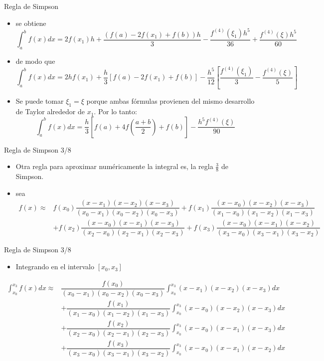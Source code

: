 \documentclass[12pt]{beamer}
\begin{document}
\begin{frame}{Regla de Simpson}
  \begin{itemize}
    \item se obtiene
    \footnotesize{
    $$
    \int_a^bf(x)dx = 2f(x_1)h + \frac{(f(a)-2f(x_1)+f(b))h}{3} - \frac{f^{(4)}(\xi_1)h^5}{36} + \frac{f^{(4)}(\xi)h^5}{60}
    $$}
    \item<2->de modo que
      $$
      \int_{a}^{b}f(x)dx = 2hf(x_1) + \dfrac{h}{3}\left[f(a) - 2f(x_1) + f(b)\right] - 
      \dfrac{h^5}{12}\left[\dfrac{f^{(4)}(\xi_1)}{3} - \dfrac{f^{(4)}(\xi)}{5}\right]
      $$
      \item<3->Se puede tomar $\xi_1 = \xi$ porque ambas f\'ormulas provienen del mismo desarrollo de Taylor alrededor de $x_1$. Por lo tanto:
      $$
      \int_{a}^{b}f(x)dx = \dfrac{h}{3}\left[f(a) + 4f\left(\dfrac{a+b}{2}\right) + f(b)\right] - \dfrac{h^5f^{(4)}(\xi)}{90}
      $$       
  \end{itemize}
\end{frame}
\begin{frame}{Regla de Simpson 3/8}
  \begin{itemize}
    \item Otra regla para aproximar num\'ericamente la integral es, la regla
    $\frac{3}{8}$ de Simpson.
    \item<2-> sea
    \scriptsize{
    \begin{align*}
      f(x) \approx & f(x_0)\dfrac{(x-x_1)(x-x_2)(x-x_3)}{(x_0-x_1)(x_0-x_2)(x_0-x_3)}+ f(x_1)\dfrac{(x-x_0)(x-x_2)(x-x_3)}{(x_1-x_0)(x_1-x_2)(x_1-x_3)}\\
      & + f(x_2)\dfrac{(x-x_0)(x-x_1)(x-x_3)}{(x_2-x_0)(x_2-x_1)(x_2-x_3)}+ f(x_3)\dfrac{(x-x_0)(x-x_1)(x-x_2)}{(x_3-x_0)(x_3-x_1)(x_3-x_2)}
    \end{align*}}    
  \end{itemize}
\end{frame}
\begin{frame}{Regla de Simpson 3/8}
  \begin{itemize}
    \item Integrando en el intervalo $[x_0,x_3]$
  \end{itemize}
  \footnotesize{
  \begin{align*}
      \int_{x_0}^{x_3}f(x)dx \approx & \dfrac{f(x_0)}{(x_0-x_1)(x_0-x_2)(x_0-x_3)}\int_{x_0}^{x_3}(x-x_1)(x-x_2)(x-x_3)dx\\
      & + \dfrac{f(x_1)}{(x_1-x_0)(x_1-x_2)(x_1-x_3)}\int_{x_0}^{x_3}(x-x_0)(x-x_2)(x-x_3)dx\\
      & + \dfrac{f(x_2)}{(x_2-x_0)(x_2-x_1)(x_2-x_3)}\int_{x_0}^{x_3}(x-x_0)(x-x_1)(x-x_3)dx\\
      & + \dfrac{f(x_3)}{(x_3-x_0)(x_3-x_1)(x_3-x_2)}\int_{x_0}^{x_3}(x-x_0)(x-x_1)(x-x_2)dx            
    \end{align*}} 
\end{frame}
\end{document}

